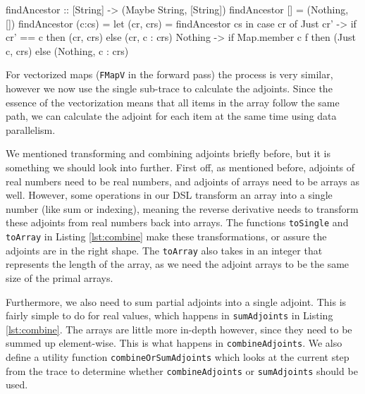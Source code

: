 \begin{haskell}
                    findAncestor :: [String] -> (Maybe String, [String])
                    findAncestor []     = (Nothing, [])
                    findAncestor (c:cs) =
                        let (cr, crs) = findAncestor cs
                        in  case cr of
                            Just cr' -> if cr' == c then (cr, crs) else (cr, c : crs)
                            Nothing  ->
                                if   Map.member c f 
                                then (Just c, crs)
                                else (Nothing, c : crs)
        \end{haskell}

        For vectorized maps (\texttt{FMapV} in the forward pass) the process is very similar, however we now use the single sub-trace to calculate the adjoints.
        Since the essence of the vectorization means that all items in the array follow the same path, we can calculate the adjoint for each item at the same time using data parallelism.

        We mentioned transforming and combining adjoints briefly before, but it is something we should look into further.
        First off, as mentioned before, adjoints of real numbers need to be real numbers, and adjoints of arrays need to be arrays as well.
        However, some operations in our DSL transform an array into a single number (like sum or indexing), meaning the reverse derivative needs to transform these adjoints from real numbers back into arrays.
        The functions \texttt{toSingle} and \texttt{toArray} in Listing \ref{lst:combine} make these transformations, or assure the adjoints are in the right shape.
        The \texttt{toArray} also takes in an integer that represents the length of the array, as we need the adjoint arrays to be the same size of the primal arrays.

        Furthermore, we also need to sum partial adjoints into a single adjoint.
        This is fairly simple to do for real values, which happens in \texttt{sumAdjoints} in Listing \ref{lst:combine}.
        The arrays are little more in-depth however, since they need to be summed up element-wise.
        This is what happens in \texttt{combineAdjoints}.
        We also define a utility function \texttt{combineOrSumAdjoints} which looks at the current step from the trace to determine whether \texttt{combineAdjoints} or \texttt{sumAdjoints} should be used.
        
